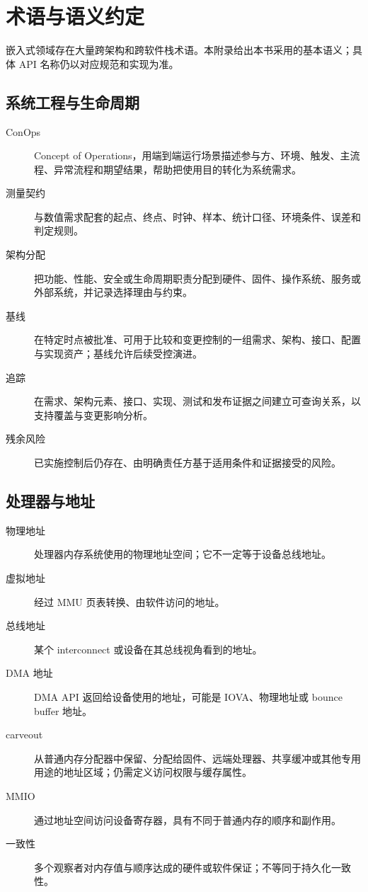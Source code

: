 \chapter{术语与语义约定}
\label{chap:terminology}

嵌入式领域存在大量跨架构和跨软件栈术语。本附录给出本书采用的基本语义；具体 API 名称仍以对应规范和实现为准。

\section{系统工程与生命周期}

\begin{description}
  \item[ConOps] Concept of Operations，用端到端运行场景描述参与方、环境、触发、主流程、异常流程和期望结果，帮助把使用目的转化为系统需求。
  \item[测量契约] 与数值需求配套的起点、终点、时钟、样本、统计口径、环境条件、误差和判定规则。
  \item[架构分配] 把功能、性能、安全或生命周期职责分配到硬件、固件、操作系统、服务或外部系统，并记录选择理由与约束。
  \item[基线] 在特定时点被批准、可用于比较和变更控制的一组需求、架构、接口、配置与实现资产；基线允许后续受控演进。
  \item[追踪] 在需求、架构元素、接口、实现、测试和发布证据之间建立可查询关系，以支持覆盖与变更影响分析。
  \item[残余风险] 已实施控制后仍存在、由明确责任方基于适用条件和证据接受的风险。
\end{description}

\section{处理器与地址}

\begin{description}
  \item[物理地址] 处理器内存系统使用的物理地址空间；它不一定等于设备总线地址。
  \item[虚拟地址] 经过 MMU 页表转换、由软件访问的地址。
  \item[总线地址] 某个 interconnect 或设备在其总线视角看到的地址。
  \item[DMA 地址] DMA API 返回给设备使用的地址，可能是 IOVA、物理地址或 bounce buffer 地址。
  \item[carveout] 从普通内存分配器中保留、分配给固件、远端处理器、共享缓冲或其他专用用途的地址区域；仍需定义访问权限与缓存属性。
  \item[MMIO] 通过地址空间访问设备寄存器，具有不同于普通内存的顺序和副作用。
  \item[一致性] 多个观察者对内存值与顺序达成的硬件或软件保证；不等同于持久化一致性。
\end{description}


